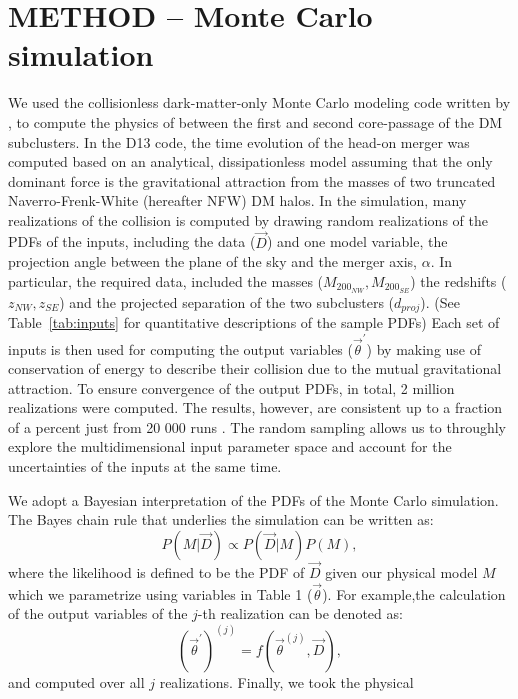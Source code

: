 \section{METHOD -- Monte Carlo simulation} 
We used the collisionless 
dark-matter-only Monte Carlo modeling code written by , to compute the physics of between
the first and second core-passage of the DM subclusters. 
In the D13 code, the time evolution of the
head-on merger was computed based on an analytical, dissipationless model
assuming that the only dominant force is the gravitational attraction from
the masses of two truncated Naverro-Frenk-White (hereafter NFW) DM halos. 
In the simulation, many realizations of the collision is
computed by drawing random realizations of the PDFs of the inputs, including
the data ($\vec{D}$) and one model variable, the projection angle between
the plane of the sky and the merger axis, $\alpha$. In particular,
the required data, included the masses ($M_{200_{NW}},M_{200_{SE}}$) the
redshifts ($z_{NW}, z_{SE}$) and the projected separation of the two
subclusters ($d_{proj}$).  (See Table~\ref{tab:inputs}
for quantitative descriptions of the sample PDFs) 
Each set of inputs is then used for computing the output variables
($\vec{\theta}^\prime$) by making use of conservation of energy to describe
their collision due to the mutual gravitational attraction.
To ensure convergence of the output PDFs, in total, 2 million realizations
were computed. 
The results, however, are consistent up to a fraction of a percent just
from 20 000 runs . The random sampling allows us to
throughly explore the multidimensional input parameter space and account
for the uncertainties of the inputs at the same time.
\par    
We adopt a Bayesian interpretation of the PDFs of the Monte Carlo
simulation. The Bayes chain rule that underlies the simulation can be written as:
\begin{equation}
    P(M|\vec{D}) \propto P(\vec{D}|M)P(M),
\end{equation}
where the likelihood is defined to be the PDF of $\vec{D}$ given our
physical model $M$ which we parametrize using variables in Table 1
($\vec{\theta}$).
For example,the
calculation of the output variables of the $j$-th realization can be denoted as: 
\begin{equation}
    (\vec{\theta}^\prime)^{(j)} = f(\vec{\theta}^{(j)}, \vec{D}), 
\end{equation}    
and computed over all $j$ realizations. Finally, we took the physical
